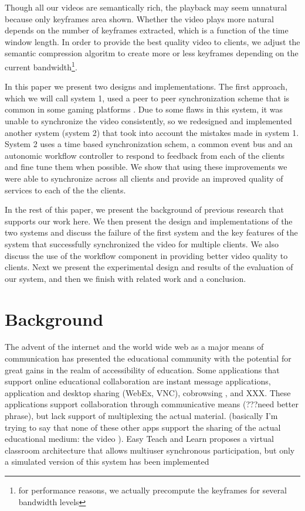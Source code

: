 \documentclass[10pt]{article}
\begin{document}
Though all our videos are semantically rich, the playback may seem
unnatural because only keyframes area shown.  Whether the video plays
more natural depends on the number of keyframes extracted, which is a
function of the time window length.  In order to provide the best
quality video to clients, we adjust the semantic compression algoritm
to create more or less keyframes depending on the current
bandwidth\footnote{for performance reasons, we actually precompute the
keyframes for several bandwidth levels}.

In this paper we present two designs and implementations.  The first
approach, which we will call system 1, used a peer to peer
synchronization scheme that is common in some gaming platforms
\citep{???}.  Due to some flaws in this system, it was unable to
synchronize the video consistently, so we redesigned and implemented
another system (system 2) that took into account the mistakes made in
system 1.  System 2 uses a time based synchronization schem, a common
event bus and an autonomic workflow controller to respond to feedback
from each of the clients and fine tune them when possible.  We show
that using these improvements we were able to synchronize across all
clients and provide an improved quality of services to each of the the
clients.

In the rest of this paper, we present the background of previous
research that supports our work here.  We then present the design and
implementations of the two systems and discuss the failure of the
first system and the key features of the system that successfully
synchronized the video for multiple clients.  We also discuss the use
of the workflow component in providing better video quality to
clients.  Next we present the experimental design and results of the
evaluation of our system, and then we finish with related work and a
conclusion.

\section{Background} \label{background}

The advent of the internet and the world wide web as a major means of
communication has presented the educational community with the
potential for great gains in the realm of accessibility of education.
Some applications that support online educational collaboration are
instant message applications, application and desktop sharing (WebEx,
VNC), cobrowsing \citep{CAPPS, LIEBERMAN, SIDLER}, and XXX.  These
applications support collaboration through communicative means
(???need better phrase), but lack support of multiplexing the actual
material.  (basically I'm trying to say that none of these other apps
support the sharing of the actual educational medium: the video ).
Easy Teach and Learn proposes a virtual classroom architecture that
allows multiuser synchronous participation, but only a simulated
version of this system has been implemented \citep{WALTER}
\end{document}
